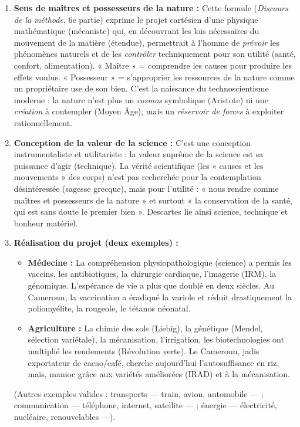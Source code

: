 \documentclass[11pt]{article}
\newcommand{\cle}[1]{{\popxbold\color{popdark}#1}}
\begin{document}
\begin{corrige}
\begin{enumerate}
\item \textbf{Sens de \guillemotleft maîtres et possesseurs de la nature \guillemotright :} Cette formule (\emph{Discours de la méthode}, 6e partie) exprime le \cle{projet cartésien} d'une \cle{physique mathématique} (mécaniste) qui, en découvrant les \cle{lois nécessaires} du mouvement de la matière (étendue), permettrait à l'homme de \emph{prévoir} les phénomènes naturels et de les \emph{contrôler} techniquement pour son utilité (santé, confort, alimentation). « Maître » = comprendre les causes pour produire les effets voulus. « Possesseur » = s'approprier les ressources de la nature comme un propriétaire use de son bien. C'est la naissance du \cle{technoscientisme} moderne : la nature n'est plus un \emph{cosmos} symbolique (Aristote) ni une \emph{création} à contempler (Moyen Âge), mais un \emph{réservoir de forces} à exploiter rationnellement.

\item \textbf{Conception de la valeur de la science :} C'est une conception \cle{instrumentaliste} et \cle{utilitariste} : la valeur suprême de la science est sa \cle{puissance d'agir} (technique). La vérité scientifique (les « causes et les mouvements » des corps) n'est pas recherchée pour la contemplation désintéressée (sagesse grecque), mais pour l'\cle{utilité} : « nous rendre comme maîtres et possesseurs de la nature » et surtout « la conservation de la santé, qui est sans doute le premier bien ». Descartes lie ainsi science, technique et \cle{bonheur matériel}.

\item \textbf{Réalisation du projet (deux exemples) :}
\begin{itemize}
\item \textbf{Médecine :} La compréhension physiopathologique (science) a permis les vaccins, les antibiotiques, la chirurgie cardiaque, l'imagerie (IRM), la génomique. L'espérance de vie a plus que doublé en deux siècles. Au Cameroun, la vaccination a éradiqué la variole et réduit drastiquement la poliomyélite, la rougeole, le tétanos néonatal.
\item \textbf{Agriculture :} La chimie des sols (Liebig), la génétique (Mendel, sélection variétale), la mécanisation, l'irrigation, les biotechnologies ont multiplié les rendements (Révolution verte). Le Cameroun, jadis exportateur de cacao/café, cherche aujourd'hui l'autosuffisance en riz, maïs, manioc grâce aux variétés améliorées (IRAD) et à la mécanisation.
\end{itemize}
(Autres exemples valides : transports — train, avion, automobile — ; communication — téléphone, internet, satellite — ; énergie — électricité, nucléaire, renouvelables —).


\end{enumerate}
\end{corrige}
\end{document}
